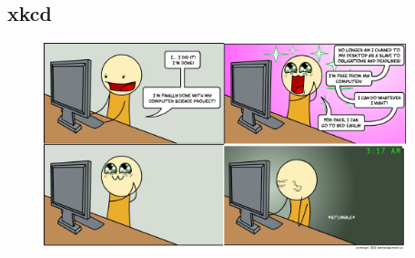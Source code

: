 \documentclass{beamer}
\begin{document}
\subsection{xkcd}
\begin{frame}[plain]
  \begin{figure}
    \begin{center}
      \includegraphics[width=300pt]{3am.png}
    \end{center}
  \end{figure}
\end{frame}
\end{document}
